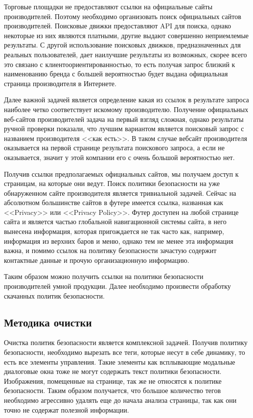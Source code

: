 \documentclass[../main]{subfiles}
\begin{document}
Торговые площадки не предоставляют ссылки на официальные сайты производителей. Поэтому необходимо организовать поиск официальных сайтов производителей. Поисковые движки предоставляют API для поиска, однако некоторые из них являются платными, другие выдают совершенно неприемлемые результаты. С другой использование поисковых движков, предназначенных для реальных пользователей, дает наилучшие результаты из возможных, скорее всего это связано с клиентоориентированностью, то есть получая запрос близкий к наименованию бренда с большей вероятностью будет выдана официальная страница производителя в Интернете.

Далее важной задачей является определение какая из ссылок в результате запроса наиболее четко соответствует искомому производителю. Получение официальных веб-сайтов производителей задача на первый взгляд сложная, однако результаты ручной проверки показали, что лучшим вариантом является поисковый запрос с названием производителя <<как есть>>. В таком случае вебсайт производителя оказывается на первой странице результата поискового запроса, а если не оказывается, значит у этой компании его с очень большой вероятностью нет. 

Получив ссылки предполагаемых официальных сайтов, мы получаем доступ к страницам, на которые они ведут. Поиск политики безопасности на уже обнаруженном сайте производителя является тривиальной задачей. Сейчас на абсолютном большинстве сайтов в футере имеется ссылка, названная как <<Privacy>> или <<Privacy Policy>>. Футер доступен на любой странице сайта и является частью глобальной навигационной системы сайта, в него вынесена информация, которая пригождается не так часто как, например, информация из верхних баров и меню, однако тем не менее эта информация важна, и помимо ссылок на политику безопасности зачастую содержит контактные данные и прочую организационную информацию.

Таким образом можно получить ссылки на политики безопасности производителей умной продукции. Далее необходимо произвести обработку скачанных политик безопасности.

\subsection{Методика очистки}

Очистка политик безопасности является комплексной задачей. Получив политику безопасности, необходимо вырезать все теги, которые несут в себе динамику, то есть все элементы управления. Такие элементы как всплывающие модальные диалоговые окна тоже не могут содержать текст политики безопасности. Изображения, помещенные на странице, так же не относятся к политике безопасности. Таким образом получается, что большое количество тегов необходимо агрессивно удалять еще до начала анализа страницы, так как они точно не содержат полезной информации.
\end{document}

